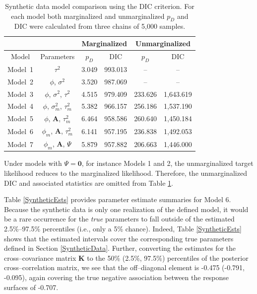 \documentclass[a4paper]{article}
\newcommand{\bzero}{\textbf{0}}
\newcommand{\bA}{\textbf{A}}
\newcommand{\bK}{\textbf{K}}
\begin{document}
\begin{table}[!h]
\begin{center}
\caption{Synthetic data model comparison using the DIC criterion.  For each model both marginalized and unmarginalized $p_{D}$ and DIC were calculated from three chains of 5,000 samples.}\label{DIC}
\begin{tabular}
[c]{|c|c|c|c|c|c|}%
\hline 
\multicolumn{2}{|c}{} & \multicolumn{2}{|c|}{Marginalized} & \multicolumn{2}{|c|}{Unmarginalized}\\
\hline Model & Parameters & $p_{D}$ & DIC & $p_{D}$ & DIC\\\hline
Model~1 & $\tau^2$                          			&  3.049& 993.013& -- & --\\
Model~2 & $\phi$, $\sigma^2$                        	& 3.520& 987.069& -- & --\\
Model~3 & $\phi$, $\sigma^2$, $\tau^2$              	& 4.515& 979.409&  233.626& 1,643.619 \\
Model~4 & $\phi$, $\sigma^2_m$, $\tau^2_m$	&  5.382& 966.157&  256.186& 1,537.190\\
Model~5 &  $\phi$, $\bA$, $\tau^2_m$			&  6.464& 958.586&  260.640& 1,450.184\\
Model~6 &  $\phi_m$, $\bA$, $\tau^2_m$             &  6.141& 957.195&  236.838& 1,492.053\\
Model~7 &  $\phi_m$, $\bA$, $\Psi$                  	&  5.879& 957.882&  206.663& 1,446.000\\
\hline
\end{tabular}
\end{center}
\end{table}

Under models with $\Psi = \bzero$, for instance Models 1 and 2, the unmarginalized target likelihood reduces to the marginalized likelihood.  Therefore, the unmarginalized DIC and associated statistics are omitted from Table \ref{DIC}. 

Table \ref{SyntheticEsts} provides parameter estimate summaries for
Model 6.  Because the synthetic data is only one realization of the defined model, it would be a rare occurrence for the
\emph{true} parameters to fall outside of the estimated 2.5\%--97.5\% percentiles (i.e., only a 5\% chance).  Indeed, Table \ref{SyntheticEsts} shows that the estimated
intervals cover the corresponding true parameters defined in Section
\ref{SyntheticData}.  Further, converting the estimates for the
cross--covariance matrix $\bK$ to the 50\% (2.5\%, 97.5\%)
percentiles of the posterior cross--correlation matrix, we see that
the off--diagonal element is -0.475 (-0.791, -0.095), again
covering the true negative association between the response surfaces
of -0.707.
\end{document}
